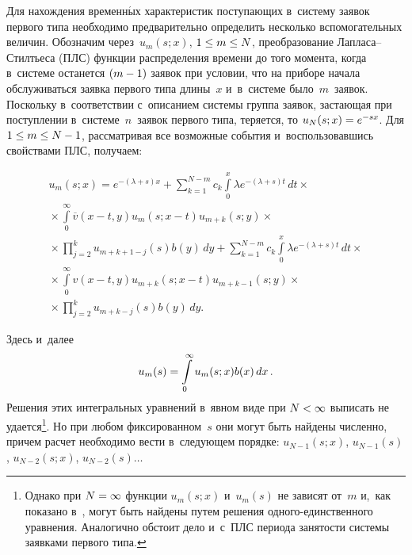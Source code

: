 \begin{multicols}{2}
Для нахождения временн$\acute{\mbox{ы}}$х характеристик поступающих 
в~систему заявок первого типа необходимо предварительно определить 
несколько вспомогательных величин.
Обозначим через~$u_m(s;x)$, $1\hm \le m\hm \le N$, 
преобразование Лап\-ла\-са--Стилть\-еса (ПЛС) функции распределения
времени до того момента,
когда в~системе останется $(m\hm-1)$ заявок при условии,
что на приборе начала обслуживаться заявка первого типа длины~$x$
и~в~системе было~$m$~заявок.
Поскольку в~соответствии с~описанием системы
группа заявок, застающая при поступлении в~системе~$n$~заявок 
первого типа, теряется, то $u_{N}(s;x)\hm=e^{- s x}$.
Для $1 \hm\le m \hm\le N-1$, рассматривая все возможные события 
и~воспользовавшись свойствами ПЛС, получаем:

\noindent
\begin{multline*}
u_{m}(s;x) = e^{- (\lambda+s) x} +
\sum\limits_{k=1}^{N-m} c_k
\int\limits_0^x \lambda e^{- (\lambda+s) t} \, dt\times{}\\
{}\times
\int\limits_0^\infty \overline{v}(x-t,y) u_{m}(s;x-t) 
u_{m+k}(s;y) \times{}\\
{}\times \prod\limits_{j=2}^{k} \! u_{m+k+1-j}(s) b(y)\,dy
+\!\sum\limits_{k=1}^{N-m} \!c_k\!
\int\limits_0^x \!\lambda e^{- (\lambda+s) t} \, dt\times{}\\
{}\times
\int\limits_0^\infty v(x-t,y) u_{m+k}(s;x-t) u_{m+k-1}(s;y) \times{}\\
{}\times
\prod\limits_{j=2}^{k} u_{m+k-j}(s) b(y)\,dy.
\end{multline*}


\noindent 
Здесь и~далее 
$$u_m(s)\hm=\int\limits_0^\infty u_m(s;x)b(x)\,dx\,.
$$ 
Решения этих интегральных уравнений в~явном виде
при $N\hm<\infty$ выписать не удается\footnote{Однако при $N\hm=\infty$
функции $u_{m}(s;x)$ и~$u_{m}(s)$ не зависят от~$m$ и,~как показано 
в~\cite[с.~14]{R1}, могут быть найдены путем решения
одного-единственного уравнения. Аналогично обстоит дело и~с~ПЛС 
периода занятости системы заявками первого типа.}.
Но при любом фиксированном~$s$ они могут быть найдены численно,
причем расчет необходимо вести в~сле\-ду\-ющем
порядке: $u_{N-1}(s;x)$, $u_{N-1}(s)$, $u_{N-2}(s;x)$,
$u_{N-2}(s)\dots$


\end{multicols}
